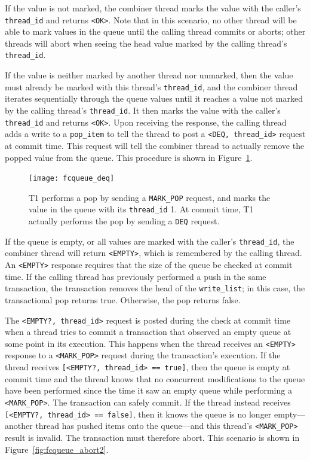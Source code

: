 If the value is not marked, the combiner thread marks the value with the caller's \texttt{thread\_id} and returns \texttt{<OK>}. Note that in this scenario, no other thread will be able to mark values in the queue until the calling thread commits or aborts; other threads will abort when seeing the head value marked by the calling thread's \texttt{thread\_id}. 

If the value is neither marked by another thread nor unmarked, then the value must already be marked with this thread's \texttt{thread\_id}, and the combiner thread iterates sequentially through the queue values until it reaches a value not marked by the calling thread's \texttt{thread\_id}. It then marks the value with the caller's \texttt{thread\_id} and returns \texttt{<OK>}. Upon receiving the response, the calling thread adds a write to a \texttt{pop\_item} to tell the thread to post a \texttt{<DEQ, thread\_id>} request at commit time. This request will tell the combiner thread to actually remove the popped value from the queue. This procedure is shown in Figure~\ref{fig:fcqueue_deq}.

\begin{figure}[t]
\centering
\texttt{[image: fcqueue\_deq]}
    \caption[Transactional flat combining pop request execution]{T1 performs a pop by sending a \texttt{MARK\_POP} request, and marks the value in the queue with its \texttt{thread\_id} 1. At commit time, T1 actually performs the pop by sending a \texttt{DEQ} request.} 
\label{fig:fcqueue_deq}
\end{figure}

If the queue is empty, or all values are marked with the caller's \texttt{thread\_id}, the combiner thread will return \texttt{<EMPTY>}, which is remembered by the calling thread. An \texttt{<EMPTY>} response requires that the size of the queue be checked at commit time. If the calling thread has previously performed a push in the same transaction, the transaction removes the head of the \texttt{write\_list}; in this case, the transactional pop returns true. Otherwise, the pop returns false.

The \texttt{<EMPTY?, thread\_id>} request is posted during the check at commit time when a thread tries to commit a transaction that observed an empty queue at some point in its execution. This happens when the thread receives an \texttt{<EMPTY>} response to a \texttt{<MARK\_POP>} request during the transaction's execution. If the thread receives \texttt{[<EMPTY?, thread\_id> == true]}, then the queue is empty at commit time and the thread knows that no concurrent modifications to the queue have been performed since the time it saw an empty queue while performing a \texttt{<MARK\_POP>}. The transaction can safely commit. If the thread instead receives \texttt{[<EMPTY?, thread\_id> == false]}, then it knows the queue is no longer empty---another thread has pushed items onto the queue---and this thread's \texttt{<MARK\_POP>} result is invalid. The transaction must therefore abort. This scenario is shown in Figure~\ref{fig:fcqueue_abort2}.

